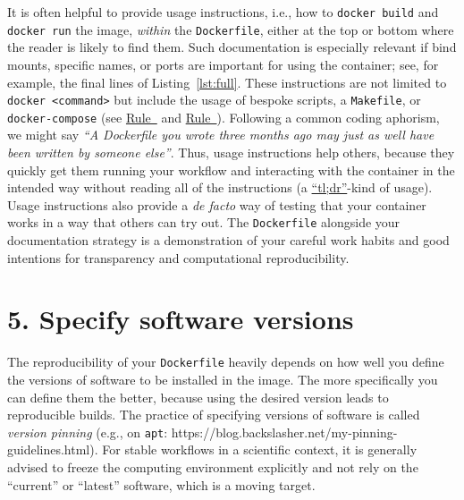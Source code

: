 \documentclass[10pt,letterpaper]{article}
\begin{document}
It is often helpful to provide usage instructions, i.e., how to
\texttt{docker\ build} and \texttt{docker\ run} the image, \emph{within}
the \texttt{Dockerfile}, either at the top or bottom where the reader is
likely to find them. Such documentation is especially relevant if bind
mounts, specific names, or ports are important for using the container;
see, for example, the final lines of Listing~\ref{lst:full}. These
instructions are not limited to
\texttt{docker\ \textless{}command\textgreater{}} but include the usage
of bespoke scripts, a \texttt{Makefile}, or \texttt{docker-compose} (see
\hyperref[{rule:interactive}]{Rule~} and
\hyperref[{rule:usage}]{Rule~}). Following a
common coding aphorism, we might say \emph{``A Dockerfile you wrote
three months ago may just as well have been written by someone else''}.
Thus, usage instructions help others, because they quickly get them
running your workflow and interacting with the container in the intended
way without reading all of the instructions (a
\href{https://en.wikipedia.org/wiki/Wikipedia:Too_long;_didn\%27t_read}{``tl;dr''}-kind
of usage). Usage instructions also provide a \emph{de facto} way of
testing that your container works in a way that others can try out. The
\texttt{Dockerfile} alongside your documentation strategy is a
demonstration of your careful work habits and good intentions for
transparency and computational reproducibility.

\hypertarget{specify-software-versions}{%
\section*{5. Specify software
versions}\label{specify-software-versions}}

  \label{rule:pinning} 

The reproducibility of your \texttt{Dockerfile} heavily depends on how
well you define the versions of software to be installed in the image.
The more specifically you can define them the better, because using the
desired version leads to reproducible builds. The practice of specifying
versions of software is called \emph{version pinning} (e.g., on
\texttt{apt}: https://blog.backslasher.net/my-pinning-guidelines.html).
For stable workflows in a scientific context, it is generally advised to
freeze the computing environment explicitly and not rely on the
``current'' or ``latest'' software, which is a moving target.
\end{document}
